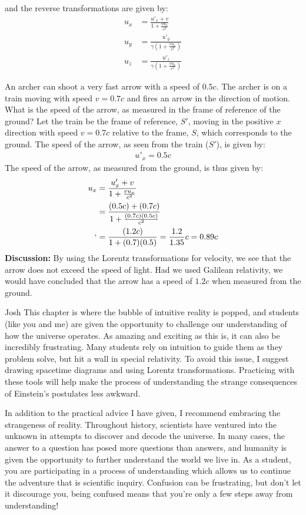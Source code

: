 and the reverse transformations are given by:
\begin{align*}
u_x &=\frac{u'_x +v}{1+ \frac{vu_x}{c^2}}\\
u_y &=\frac{u'_y}{\gamma\left(1+ \frac{vu_x}{c^2}\right)}\\
u_z &=\frac{u'_z}{\gamma\left(1+ \frac{vu_x}{c^2}\right)}
\end{align*}
\begin{example}{An archer can shoot a very fast arrow with a speed of $0.5c$. The archer is on a train moving with speed $v=0.7c$ and fires an arrow in the direction of motion. What is the speed of the arrow, as measured in the frame of reference of the ground?}
Let the train be the frame of reference, $S'$, moving in the positive $x$ direction with speed $v=0.7c$ relative to the frame, $S$, which corresponds to the ground. The speed of the arrow, as seen from the train ($S'$), is given by:
\begin{align*}
u'_x = 0.5c
\end{align*}
The speed of the arrow, as measured from the ground, is thus given by:
\begin{align*}
u_x &=\frac{u'_x +v}{1+ \frac{vu_x}{c^2}}\\
&=\frac{(0.5c) +(0.7c)}{1+ \frac{(0.7c)(0.5c)}{c^2}}\\`
&=\frac{(1.2c)}{1+(0.7)(0.5)}=\frac{1.2}{1.35}c=0.89c
\end{align*}
\textbf{Discussion:} By using the Lorentz transformations for velocity, we see that the arrow does not exceed the speed of light. Had we used Galilean relativity, we would have concluded that the arrow has a speed of $1.2c$ when measured from the ground. 
\end{example}

\begin{studentOpinion}{Josh}{}
	This chapter is where the bubble of intuitive reality is popped, and students (like you and me) are given the opportunity to challenge our understanding of how the universe operates. As amazing and exciting as this is, it can also be incredibly frustrating. Many students rely on intuition to guide them as they problem solve, but hit a wall in special relativity. To avoid this issue, I suggest drawing spacetime diagrams and using Lorentz transformations. Practicing with these tools will help make the process of understanding the strange consequences of Einstein's postulates less awkward. 
	
	In addition to the practical advice I have given, I recommend embracing the strangeness of reality. Throughout history, scientists have ventured into the unknown in attempts to discover and decode the universe. In many cases, the answer to a question has posed more questions than answers, and humanity is given the opportunity to further understand the world we live in. As a student, you are participating in a process of understanding which allows us to continue the adventure that is scientific inquiry. Confusion can be frustrating, but don't let it discourage you, being confused means that you're only a few steps away from understanding! 
\end{studentOpinion}

